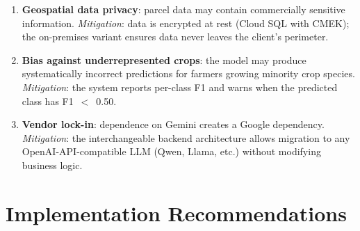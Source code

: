 \documentclass{article}
\begin{document}
\begin{enumerate}[leftmargin=*]
    \item \textbf{Geospatial data privacy}: parcel data may contain
    commercially sensitive information. \textit{Mitigation}: data is
    encrypted at rest (Cloud SQL with CMEK); the on-premises variant
    ensures data never leaves the client's perimeter.

    \item \textbf{Bias against underrepresented crops}: the model may
    produce systematically incorrect predictions for farmers growing
    minority crop species. \textit{Mitigation}: the system reports per-class
    F1 and warns when the predicted class has F1~$<$~0.50.

    \item \textbf{Vendor lock-in}: dependence on Gemini creates a Google
    dependency. \textit{Mitigation}: the interchangeable backend
    architecture allows migration to any OpenAI-API-compatible LLM
    (Qwen, Llama, etc.) without modifying business logic.
\end{enumerate}

\section{Implementation Recommendations}
\end{document}
